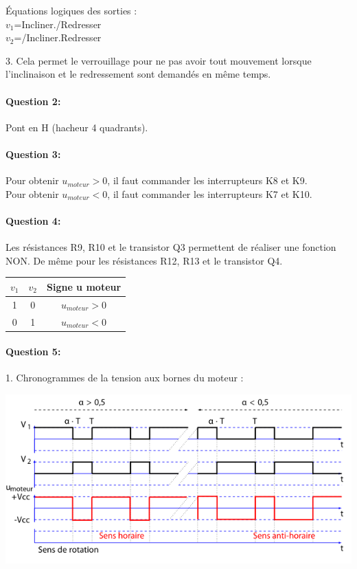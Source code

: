Équations logiques des sorties : \\
$v_1$=Incliner./Redresser \\
$v_2$=/Incliner.Redresser
 
3. Cela permet le verrouillage pour ne pas avoir tout mouvement lorsque l'inclinaison et le redressement sont demandés en même temps.

\paragraph{Question 2:} 
Pont en H (hacheur 4 quadrants).

\paragraph{Question 3:} 

Pour obtenir $u_{moteur}>0$, il faut commander les interrupteurs K8 et K9.\\
Pour obtenir $u_{moteur}<0$, il faut commander les interrupteurs K7 et K10.

\paragraph{Question 4:} 

Les résistances R9, R10 et le transistor Q3 permettent de réaliser une fonction NON. De même pour les résistances R12, R13 et le transistor Q4.

\begin{center}
\begin{tabular}{|c|c|c|}
\hline
$v_1$ & $v_2$ & Signe u moteur\\
\hline
1 & 0 & $u_{moteur}>0$ \\
\hline
0 & 1 & $u_{moteur}<0$ \\
\hline
\end{tabular}
\end{center}

\paragraph{Question 5:} 
1. Chronogrammes de la tension aux bornes du moteur :

\begin{center}
 \includegraphics[width=0.7\linewidth]{img/img04}
\end{center}

